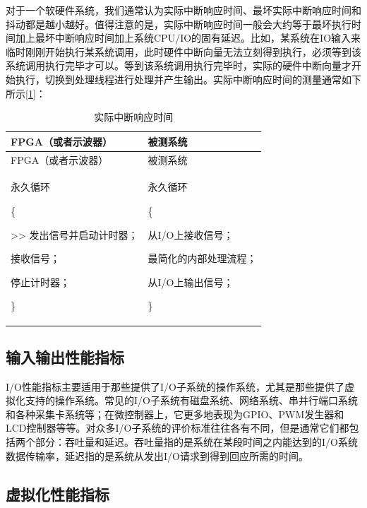 对于一个软硬件系统，我们通常认为实际中断响应时间、最坏实际中断响应时间和抖动都是越小越好。值得注意的是，实际中断响应时间一般会大约等于最坏执行时间加上最坏中断响应时间加上系统CPU/IO的固有延迟。比如，某系统在IO输入来临时刚刚开始执行某系统调用，此时硬件中断向量无法立刻得到执行，必须等到该系统调用执行完毕才可以。等到该系统调用执行完毕时，实际的硬件中断向量才开始执行，切换到处理线程进行处理并产生输出。实际中断响应时间的测量通常如下所示\hyperref[cite:1-1]{{[}1{]}}：

\begin{xltabular}{\textwidth}{@{}>{\hsize\raggedright\arraybackslash}X>{\hsize\raggedright\arraybackslash}X@{}}
\caption{实际中断响应时间}\label{tab:1-13-actual-interrupt-response-time}\\
\toprule
FPGA（或者示波器） & 被测系统\tabularnewline
\endfirsthead
\toprule
FPGA（或者示波器） & 被测系统\tabularnewline
\midrule
\endhead
\bottomrule
\endlastfoot
永久循环

\{

\textgreater\textgreater{} 发出信号并启动计时器；

接收信号；

停止计时器；

\}\strut
 & 永久循环

\{

从I/O上接收信号；

最简化的内部处理流程；

从I/O上输出信号；

\}\strut
\tabularnewline
\end{xltabular}

\subsection{输入输出性能指标}\label{subsec:1-io-performance-metrics}

I/O性能指标主要适用于那些提供了I/O子系统的操作系统，尤其是那些提供了虚拟化支持的操作系统。常见的I/O子系统有磁盘系统、网络系统、串并行端口系统和各种采集卡系统等；在微控制器上，它更多地表现为GPIO、PWM发生器和LCD控制器等等。对众多I/O子系统的评价标准往往各有不同，但是通常它们都包括两个部分：吞吐量和延迟。吞吐量指的是系统在某段时间之内能达到的I/O系统数据传输率，延迟指的是系统从发出I/O请求到得到回应所需的时间。

\subsection{虚拟化性能指标}\label{subsec:1-virtualization-performance-metrics}

